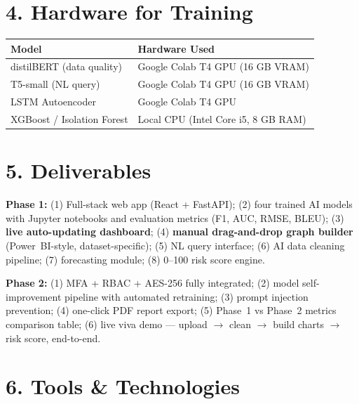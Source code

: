 \documentclass[10pt,twocolumn]{article}
\begin{document}
\section{4. Hardware for Training}

\begin{center}
\small
\begin{tabularx}{\columnwidth}{@{}l X@{}}
\toprule
\textbf{Model} & \textbf{Hardware Used} \\
\midrule
distilBERT (data quality)   & Google Colab T4 GPU (16 GB VRAM) \\
T5-small (NL query)         & Google Colab T4 GPU (16 GB VRAM) \\
LSTM Autoencoder            & Google Colab T4 GPU \\
XGBoost / Isolation Forest  & Local CPU (Intel Core i5, 8 GB RAM) \\
\bottomrule
\end{tabularx}
\end{center}

\section{5. Deliverables}

\textbf{Phase 1:} (1) Full-stack web app (React + FastAPI); (2) four trained AI
models with Jupyter notebooks and evaluation metrics (F1, AUC, RMSE, BLEU);
(3) \textbf{live auto-updating dashboard}; (4) \textbf{manual drag-and-drop graph
builder} (Power~BI-style, dataset-specific); (5) NL query interface;
(6) AI data cleaning pipeline; (7) forecasting module; (8) 0--100 risk score engine.

\textbf{Phase 2:} (1) MFA + RBAC + AES-256 fully integrated; (2) model
self-improvement pipeline with automated retraining; (3) prompt injection
prevention; (4) one-click PDF report export; (5) Phase~1 vs Phase~2 metrics
comparison table; (6) live viva demo — upload $\to$ clean $\to$ build charts
$\to$ risk score, end-to-end.

\section{6. Tools \& Technologies}
\end{document}
